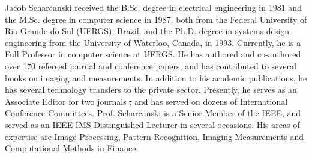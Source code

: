 \documentclass{ieeeaccess}
\makeatletter
\providecommand{\DIFdel}[1]{{\protect\color{red}\sout{#1}}} %
\providecommand{\DIFdelbegin}{} %
\providecommand{\DIFdelend}{} %
\newcommand{\DIFscaledelfig}{0.5}
\newlength{\DIFdelgraphicswidth} %
\newlength{\DIFdelgraphicsheight} %
\newcommand{\DIFdelincludegraphics}[2][]{%
\sbox{\DIFdelgraphicsbox}{\DIFOincludegraphics[#1]{#2}}%
\settoboxwidth{\DIFdelgraphicswidth}{\DIFdelgraphicsbox} %
\settoboxtotalheight{\DIFdelgraphicsheight}{\DIFdelgraphicsbox} %
\scalebox{\DIFscaledelfig}{%
\parbox[b]{\DIFdelgraphicswidth}{\usebox{\DIFdelgraphicsbox}\\[-\baselineskip] \rule{\DIFdelgraphicswidth}{0em}}\llap{\resizebox{\DIFdelgraphicswidth}{\DIFdelgraphicsheight}{%
\setlength{\unitlength}{\DIFdelgraphicswidth}%
\begin{picture}(1,1)%
\thicklines\linethickness{2pt} %
{\color[rgb]{1,0,0}\put(0,0){\framebox(1,1){}}}%
{\color[rgb]{1,0,0}\put(0,0){\line( 1,1){1}}}%
{\color[rgb]{1,0,0}\put(0,1){\line(1,-1){1}}}%
\end{picture}%
}\hspace*{3pt}}} %
} %
\DeclareRobustCommand{\DIFdelbegin}{\DIFOdelbegin \let\includegraphics\DIFdelincludegraphics} %
\DeclareRobustCommand{\DIFdelend}{\DIFOaddend \let\includegraphics\DIFOincludegraphics} %
\let\sout@orig\sout %
\renewcommand{\sout}[1]{\ifmmode\text{\sout@orig{\ensuremath{#1}}}\else\sout@orig{#1}\fi} %
\makeatother
\begin{document}

\begin{IEEEbiography}
{Jacob Scharcanski}
received the B.Sc. degree in electrical engineering in 1981 and the M.Sc.
degree in computer science in 1987, both from the Federal University of Rio
Grande do Sul (UFRGS), Brazil, and the Ph.D. degree in systems design
engineering from the University of Waterloo, Canada, in 1993. Currently, he
is a Full Professor in computer science at UFRGS.  He has authored and
co-authored over 170 refereed journal and conference papers, and has
contributed to several books on imaging and measurements. In addition to his
academic publications, he has several technology transfers to the private
sector. Presently, he serves as an Associate Editor for two journals \DIFdelbegin \DIFdel{, }\DIFdelend and has
served on dozens of International Conference Committees. Prof. Scharcanski is
a Senior Member of the IEEE, and served as an IEEE IMS Distinguished Lecturer
in several occasions. His areas of expertise are Image Processing, Pattern
Recognition, Imaging Measurements and Computational Methods in Finance.
\end{IEEEbiography}

\EOD
\end{document}
